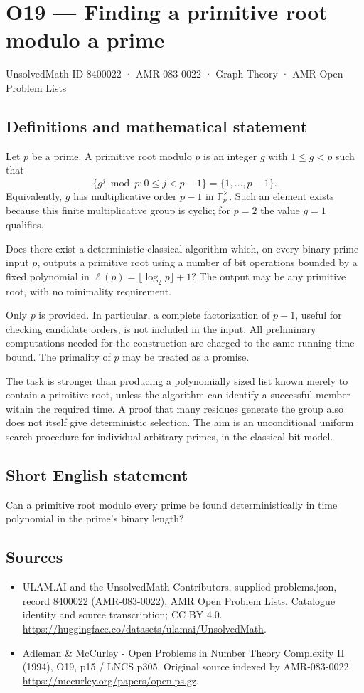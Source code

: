 \documentclass[11pt,a4paper]{article}
\begin{document}
\section*{O19 — Finding a primitive root modulo a prime}\label{8400022}
{\small UnsolvedMath ID 8400022 · AMR-083-0022 · Graph Theory · AMR Open Problem Lists}
\subsection{Definitions and mathematical statement}
Let $p$ be a prime. A primitive root modulo $p$ is an integer $g$ with $1\le g<p$ such that
\[
\{g^j\bmod p:0\le j<p-1\}=\{1,\ldots,p-1\}.
\]
Equivalently, $g$ has multiplicative order $p-1$ in $\mathbb F_p^\times$. Such an element exists because this finite multiplicative group is cyclic; for $p=2$ the value $g=1$ qualifies.

Does there exist a deterministic classical algorithm which, on every binary prime input $p$, outputs a primitive root using a number of bit operations bounded by a fixed polynomial in $\ell(p)=\lfloor\log_2p\rfloor+1$? The output may be any primitive root, with no minimality requirement.

Only $p$ is provided. In particular, a complete factorization of $p-1$, useful for checking candidate orders, is not included in the input. All preliminary computations needed for the construction are charged to the same running-time bound. The primality of $p$ may be treated as a promise.

The task is stronger than producing a polynomially sized list known merely to contain a primitive root, unless the algorithm can identify a successful member within the required time. A proof that many residues generate the group also does not itself give deterministic selection. The aim is an unconditional uniform search procedure for individual arbitrary primes, in the classical bit model.
\subsection{Short English statement}
Can a primitive root modulo every prime be found deterministically in time polynomial in the prime’s binary length?
\subsection{Sources}
\begin{itemize}
\item[S1] ULAM.AI and the UnsolvedMath Contributors, supplied problems.json, record 8400022 (AMR-083-0022), AMR Open Problem Lists. Catalogue identity and source transcription; CC BY 4.0.
\url{https://huggingface.co/datasets/ulamai/UnsolvedMath}.
\item[S2] Adleman \& McCurley - Open Problems in Number Theory Complexity II (1994), O19, p15 / LNCS p305. Original source indexed by AMR-083-0022.
\url{https://mccurley.org/papers/open.ps.gz}.
\end{itemize}
\end{document}
